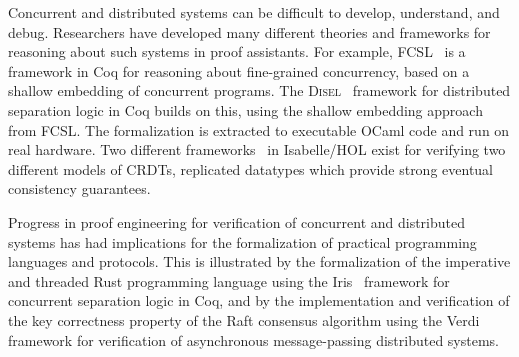 Concurrent and distributed systems can be difficult to develop, understand, and debug. Researchers have developed many different theories and frameworks for reasoning about such systems in proof assistants.
For example, FCSL~\citep{Sergey-al:PLDI15} is a framework in Coq for reasoning about fine-grained concurrency, based on a shallow embedding of concurrent programs.
The \textsc{Disel}~\citep{Sergey2017} framework for distributed separation logic in Coq builds on this,
using the shallow embedding approach from FCSL. %
The formalization is extracted to executable OCaml code and run on real hardware.
Two different frameworks~\citep{zeller2014, gomes2017verifying} in Isabelle/HOL exist for verifying two different models
of CRDTs, replicated datatypes
which provide strong eventual consistency guarantees.

Progress in proof engineering for verification of concurrent and distributed systems has had implications for the formalization of practical 
programming languages and protocols. This is illustrated by the \cite{Jung2017} formalization of the imperative and threaded Rust programming language
using the Iris~\citep{Jung2018} framework for concurrent separation logic in Coq,
and by the \cite{Woos2016} implementation and verification of the key correctness property of the Raft consensus algorithm 
using the Verdi~\citep{Wilcox2015} framework for verification of asynchronous message-passing distributed systems.






%
%
%
%

